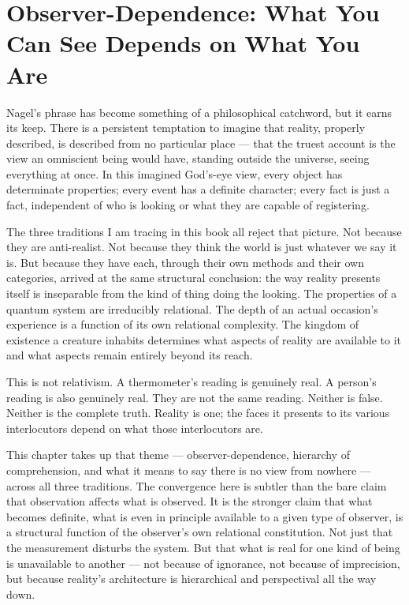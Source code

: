 \chapter[Observer-Dependence]{Observer-Dependence: What You Can See Depends on What You Are}
\label{ch:observer-dependence}


 Nagel's phrase has become something of a philosophical catchword, but it earns its keep.
There is a persistent temptation to imagine that reality, properly described, is described from no particular place --- that the truest account is the view an omniscient being would have, standing outside the universe, seeing everything at once.
In this imagined God's-eye view, every object has determinate properties; every event has a definite character; every fact is just a fact, independent of who is looking or what they are capable of registering.

The three traditions I am tracing in this book all reject that picture.
Not because they are anti-realist.
Not because they think the world is just whatever we say it is.
But because they have each, through their own methods and their own categories, arrived at the same structural conclusion: the way reality presents itself is inseparable from the kind of thing doing the looking.
The properties of a quantum system are irreducibly relational.
The depth of an actual occasion's experience is a function of its own relational complexity.
The kingdom of existence a creature inhabits determines what aspects of reality are available to it and what aspects remain entirely beyond its reach.

This is not relativism.
A thermometer's reading is genuinely real.
A person's reading is also genuinely real.
They are not the same reading.
Neither is false.
Neither is the complete truth.
Reality is one; the faces it presents to its various interlocutors depend on what those interlocutors are.

This chapter takes up that theme --- observer-dependence, hierarchy of comprehension, and what it means to say there is no view from nowhere --- across all three traditions.
The convergence here is subtler than the bare claim that observation affects what is observed.
It is the stronger claim that what becomes definite, what is even in principle available to a given type of observer, is a structural function of the observer's own relational constitution.
Not just that the measurement disturbs the system.
But that what is real for one kind of being is unavailable to another --- not because of ignorance, not because of imprecision, but because reality's architecture is hierarchical and perspectival all the way down.

